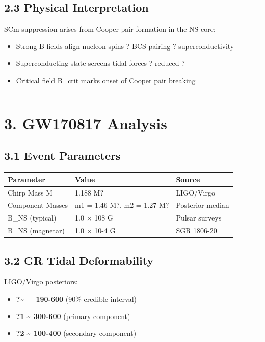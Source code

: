 \documentclass[11pt]{article}
\begin{document}
\subsection*{2.3 Physical Interpretation}

SCm suppression arises from Cooper pair formation in the NS core:

\begin{itemize}
  \item Strong B-fields align nucleon spins ? BCS pairing ? superconductivity
  \item Superconducting state screens tidal forces ? reduced ?
  \item Critical field B\_crit marks onset of Cooper pair breaking
\end{itemize}

\noindent\rule{\textwidth}{0.4pt}

\section*{3. GW170817 Analysis}

\subsection*{3.1 Event Parameters}

\begin{center}
\begin{longtable}{lll}
\toprule
Parameter & Value & Source \tabularnewline
\midrule
\endhead
Chirp Mass M & 1.188 M? & LIGO/Virgo \tabularnewline
Component Masses & m1 = 1.46 M?, m2 = 1.27 M? & Posterior median \tabularnewline
B\_NS (typical) & 1.0 $\times$ 108 G & Pulsar surveys \tabularnewline
B\_NS (magnetar) & 1.0 $\times$ 10-4 G & SGR 1806-20 \tabularnewline
\bottomrule
\end{longtable}
\end{center}

\subsection*{3.2 GR Tidal Deformability}

LIGO/Virgo posteriors:

\begin{itemize}
  \item \textbf{?\textasciitilde{} = 190-600} (90\% credible interval)
  \item \textbf{?1 \textasciitilde{} 300-600} (primary component)
  \item \textbf{?2 \textasciitilde{} 100-400} (secondary component)
\end{itemize}
\end{document}
